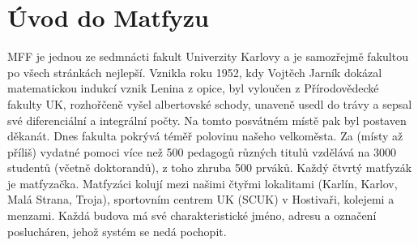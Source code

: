 \section{Úvod do Matfyzu}

MFF je jednou ze sedmnácti fakult Univerzity Karlovy a je samozřejmě fakultou
po všech stránkách nejlepší. Vznikla roku 1952, kdy Vojtěch Jarník dokázal
matematickou indukcí vznik Lenina z opice, byl vyloučen z Přírodovědecké
fakulty UK, rozhořčeně vyšel albertovské schody, unaveně usedl do trávy a
sepsal své diferenciální a integrální počty. Na tomto posvátném místě pak byl
postaven děkanát. Dnes fakulta pokrývá téměř polovinu našeho velkoměsta. Za
(místy až příliš) vydatné pomoci více než 500 pedagogů různých titulů vzdělává
na 3000 studentů (včetně doktorandů), z toho zhruba 500 prváků. Každý čtvrtý
matfyzák je matfyzačka. Matfyzáci kolují mezi našimi čtyřmi lokalitami
(Karlín, Karlov, Malá Strana, Troja), sportovním centrem UK (SCUK) v
Hostivaři, kolejemi a menzami. Každá budova má své charakteristické jméno,
adresu a označení poslucháren, jehož systém se nedá pochopit.
